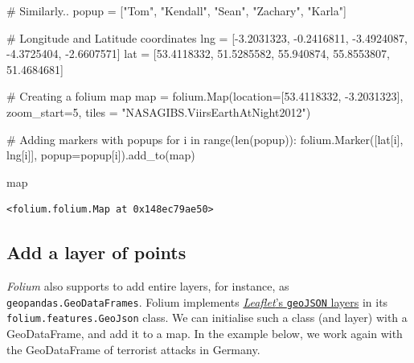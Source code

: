 \documentclass[
  letterpaper,
  DIV=11,
  numbers=noendperiod]{scrreprt}
\newenvironment{Shaded}{\begin{snugshade}}{\end{snugshade}}
\newcommand{\BuiltInTok}[1]{\textcolor[rgb]{0.00,0.23,0.31}{#1}}
\newcommand{\CommentTok}[1]{\textcolor[rgb]{0.37,0.37,0.37}{#1}}
\newcommand{\ControlFlowTok}[1]{\textcolor[rgb]{0.00,0.23,0.31}{#1}}
\newcommand{\DecValTok}[1]{\textcolor[rgb]{0.68,0.00,0.00}{#1}}
\newcommand{\FloatTok}[1]{\textcolor[rgb]{0.68,0.00,0.00}{#1}}
\newcommand{\KeywordTok}[1]{\textcolor[rgb]{0.00,0.23,0.31}{#1}}
\newcommand{\NormalTok}[1]{\textcolor[rgb]{0.00,0.23,0.31}{#1}}
\newcommand{\OperatorTok}[1]{\textcolor[rgb]{0.37,0.37,0.37}{#1}}
\newcommand{\StringTok}[1]{\textcolor[rgb]{0.13,0.47,0.30}{#1}}
\begin{document}
\begin{Shaded}
\begin{Highlighting}[]
\CommentTok{\# Similarly..}
\NormalTok{popup }\OperatorTok{=}\NormalTok{ [}\StringTok{"Tom"}\NormalTok{, }\StringTok{"Kendall"}\NormalTok{, }\StringTok{"Sean"}\NormalTok{, }\StringTok{"Zachary"}\NormalTok{, }\StringTok{"Karla"}\NormalTok{]}

\CommentTok{\# Longitude and Latitude coordinates}
\NormalTok{lng }\OperatorTok{=}\NormalTok{ [}\OperatorTok{{-}}\FloatTok{3.2031323}\NormalTok{, }\OperatorTok{{-}}\FloatTok{0.2416811}\NormalTok{, }\OperatorTok{{-}}\FloatTok{3.4924087}\NormalTok{, }\OperatorTok{{-}}\FloatTok{4.3725404}\NormalTok{, }\OperatorTok{{-}}\FloatTok{2.6607571}\NormalTok{]}
\NormalTok{lat }\OperatorTok{=}\NormalTok{ [}\FloatTok{53.4118332}\NormalTok{, }\FloatTok{51.5285582}\NormalTok{, }\FloatTok{55.940874}\NormalTok{, }\FloatTok{55.8553807}\NormalTok{, }\FloatTok{51.4684681}\NormalTok{]}

\CommentTok{\# Creating a folium map}
\BuiltInTok{map} \OperatorTok{=}\NormalTok{ folium.Map(location}\OperatorTok{=}\NormalTok{[}\FloatTok{53.4118332}\NormalTok{, }\OperatorTok{{-}}\FloatTok{3.2031323}\NormalTok{], zoom\_start}\OperatorTok{=}\DecValTok{5}\NormalTok{, tiles }\OperatorTok{=} \StringTok{"NASAGIBS.ViirsEarthAtNight2012"}\NormalTok{)}

\CommentTok{\# Adding markers with popups}
\ControlFlowTok{for}\NormalTok{ i }\KeywordTok{in} \BuiltInTok{range}\NormalTok{(}\BuiltInTok{len}\NormalTok{(popup)):}
\NormalTok{    folium.Marker([lat[i], lng[i]], popup}\OperatorTok{=}\NormalTok{popup[i]).add\_to(}\BuiltInTok{map}\NormalTok{)}

\BuiltInTok{map}
\end{Highlighting}
\end{Shaded}

\begin{verbatim}
<folium.folium.Map at 0x148ec79ae50>
\end{verbatim}

\subsection{Add a layer of points}\label{add-a-layer-of-points}

\emph{Folium} also supports to add entire layers, for instance, as
\texttt{geopandas.GeoDataFrames}. Folium implements
\href{https://leafletjs.com/reference.html\#geojson}{\emph{Leaflet}'s
\texttt{geoJSON} layers} in its \texttt{folium.features.GeoJson} class.
We can initialise such a class (and layer) with a GeoDataFrame, and add
it to a map. In the example below, we work again with the GeoDataFrame
of terrorist attacks in Germany.
\end{document}

